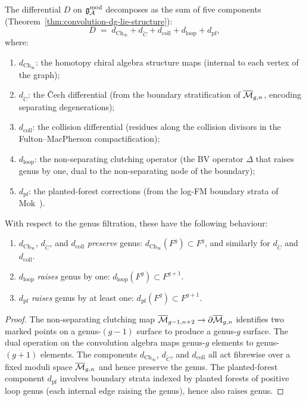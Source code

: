 The differential $D$ on $\mathfrak{g}_{\mathcal{A}}^{\mathrm{mod}}$ decomposes as the sum of
five components
(Theorem~\ref{thm:convolution-dg-lie-structure}):
\begin{equation}\label{eq:thqg-VII-D-components}
D \;=\; d_{\mathrm{Ch}_\infty}
 + d_{\check{C}}
 + d_{\mathrm{coll}}
 + d_{\mathrm{loop}}
 + d_{\mathrm{pf}},
\end{equation}
where:
\begin{enumerate}[label=(\roman*)]
\item $d_{\mathrm{Ch}_\infty}$: the homotopy chiral algebra
 structure maps (internal to each vertex of the graph);
\item $d_{\check{C}}$: the \v{C}ech differential (from the
 boundary stratification of $\overline{\mathcal{M}}_{g,n}$, encoding
 separating degenerations);
\item $d_{\mathrm{coll}}$: the collision differential (residues
 along the collision divisors in the Fulton--MacPherson
 compactification);
\item $d_{\mathrm{loop}}$: the non-separating clutching operator
 (the BV operator $\Delta$ that raises genus by one, dual to
 the non-separating node of the boundary);
\item $d_{\mathrm{pf}}$: the planted-forest corrections
 (from the log-FM boundary strata of
 Mok~\cite{Mok25}).
\end{enumerate}
With respect to the genus filtration, these have the following
behaviour:

\begin{lemma}
\label{lem:thqg-VII-genus-shifts}
\ClaimStatusProvedElsewhere
\begin{enumerate}[label=\textup{(\roman*)}]
\item $d_{\mathrm{Ch}_\infty}$, $d_{\check{C}}$, and
 $d_{\mathrm{coll}}$ \emph{preserve} genus:
 $d_{\mathrm{Ch}_\infty}(F^g) \subset F^g$,
 and similarly for $d_{\check{C}}$ and $d_{\mathrm{coll}}$.
\item $d_{\mathrm{loop}}$ \emph{raises} genus by one:
 $d_{\mathrm{loop}}(F^g) \subset F^{g+1}$.
\item $d_{\mathrm{pf}}$ \emph{raises} genus by at least one:
 $d_{\mathrm{pf}}(F^g) \subset F^{g+1}$.
\end{enumerate}
\end{lemma}

\begin{proof}
The non-separating clutching map
$\overline{\mathcal{M}}_{g-1,n+2} \to \partial\overline{\mathcal{M}}_{g,n}$
identifies two marked points on a genus-$(g{-}1)$ surface to
produce a genus-$g$ surface. The dual operation on the
convolution algebra maps genus-$g$ elements to genus-$(g{+}1)$
elements. The components $d_{\mathrm{Ch}_\infty}$,
$d_{\check{C}}$, and $d_{\mathrm{coll}}$ all act fibrewise over
a fixed moduli space $\overline{\mathcal{M}}_{g,n}$ and hence preserve
the genus. The planted-forest component $d_{\mathrm{pf}}$
involves boundary strata indexed by planted forests of positive
loop genus (each internal edge raising the genus), hence also
raises genus.
\end{proof}


